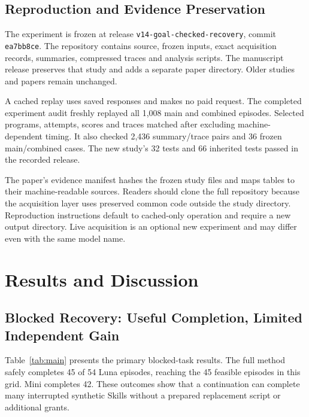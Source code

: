\documentclass[conference]{IEEEtran}
\newcommand{\code}[1]{\texttt{#1}}
\begin{document}
\subsection{Reproduction and Evidence Preservation}
The experiment is frozen at release \code{v14-goal-checked-recovery}, commit \code{ea7bb8ce}. The repository contains source, frozen inputs, exact acquisition records, summaries, compressed traces and analysis scripts. The manuscript release preserves that study and adds a separate paper directory. Older studies and papers remain unchanged.

A cached replay uses saved responses and makes no paid request. The completed experiment audit freshly replayed all 1,008 main and combined episodes. Selected programs, attempts, scores and traces matched after excluding machine-dependent timing. It also checked 2,436 summary/trace pairs and 36 frozen main/combined cases. The new study's 32 tests and 66 inherited tests passed in the recorded release.

The paper's evidence manifest hashes the frozen study files and maps tables to their machine-readable sources. Readers should clone the full repository because the acquisition layer uses preserved common code outside the study directory. Reproduction instructions default to cached-only operation and require a new output directory. Live acquisition is an optional new experiment and may differ even with the same model name.

\section{Results and Discussion}
\subsection{Blocked Recovery: Useful Completion, Limited Independent Gain}
Table~\ref{tab:main} presents the primary blocked-task results. The full method safely completes 45 of 54 Luna episodes, reaching the 45 feasible episodes in this grid. Mini completes 42. These outcomes show that a continuation can complete many interrupted synthetic Skills without a prepared replacement script or additional grants.
\end{document}
